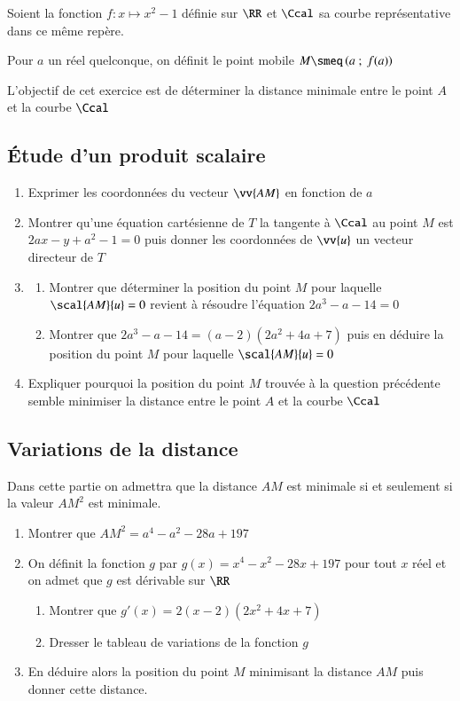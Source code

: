 \documentclass[oneside,12pt]{article}
\begin{document}
Soient la fonction $f:x\mapsto x^2-1$ définie sur $\RR$ et $\Ccal$ sa courbe représentative dans ce même repère.

Pour $a$ un réel quelconque, on définit le point mobile $M\smeq\left(a~;~f(a)\right)$


L'objectif de cet exercice est de déterminer la distance minimale entre le point $A$ et la courbe $\Ccal$

\subsection{Étude d'un produit scalaire}
\begin{enumerate}
	\item Exprimer les coordonnées du vecteur $\vv{AM}$ en fonction de $a$
	\item Montrer qu'une équation cartésienne de $T$ la tangente à $\Ccal$ au point $M$ est $2ax-y+a^2-1=0$ puis donner les coordonnées de $\vv{u}$ un vecteur directeur de $T$
	\item \begin{enumerate}
		\item Montrer que déterminer la position du point $M$ pour laquelle $\scal{AM}{u}=0$ revient à résoudre l'équation $2a^3-a-14=0$
		\item Montrer que $2a^3-a-14=(a-2)(2a^2+4a+7)$ puis en déduire la position du point $M$ pour laquelle $\scal{AM}{u}=0$ 
		\end{enumerate}
	\item Expliquer pourquoi la position du point $M$ trouvée à la question précédente semble minimiser la distance entre le point $A$ et la courbe $\Ccal$
\end{enumerate}

\subsection{Variations de la distance}
Dans cette partie on admettra que la distance $AM$ est minimale si et seulement si la valeur $AM^2$ est minimale.
\begin{enumerate}
	\item Montrer que $AM^2=a^4-a^2-28a+197$
	\item On définit la fonction $g$ par $g(x)=x^4-x^2-28x+197$ pour tout $x$ réel et on admet que $g$ est dérivable sur $\RR$
		\begin{enumerate}
			\item Montrer que $g'(x)=2(x-2)(2x^2+4x+7)$
			\item Dresser le tableau de variations de la fonction $g$
		\end{enumerate}
	\item En déduire alors la position du point $M$ minimisant la distance $AM$ puis donner cette distance.
\end{enumerate}
\end{document}
